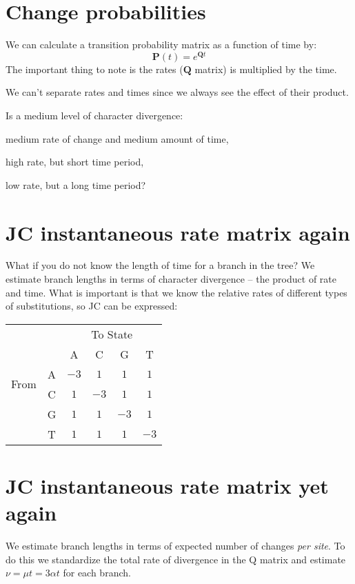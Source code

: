 \documentclass[landscape]{foils}
\begin{document}
\myNewSlide
\section*{Change probabilities}
We can calculate a transition probability matrix as a function of time by:
\[\mathbf{P}(t) = e^{\mathbf{Q}t}\]
The important thing to note is the rates ($\mathbf{Q}$ matrix) is multiplied by the time.

We can't separate rates and times since we always see the effect of their product.

Is a medium level of character divergence:
\begin{compactenum}
	\item medium rate of change and medium amount of time,
	\item high rate, but short time period,
	\item low rate, but a long time period?
\end{compactenum}
\myNewSlide
\section*{JC instantaneous rate matrix again}
What if you do not know the length of time for a branch in the tree?
We estimate branch lengths in terms of character divergence -- the product of rate and time.
What is important is that we know the relative rates of different types of substitutions, so JC can be expressed:
\begin{table}[htdp]
\begin{center}
\begin{tabular}{cc|cccc}
& & \multicolumn{4}{c}{To State} \\
& & A & C & G & T \\
\hline
\multirow{2}{*}{From } & A &  $-3$ & $1$ & $1$ & $1$    \\
\multirow{2}{*}{State } &C & $1$ & $-3$ & $1$ & $1$    \\
 &G & $1$ & $1$ & $-3$ & $1$ \\
 &T & $1$ & $1$ & $1$ & $-3$ \\
\end{tabular}
\end{center}
\end{table}

\myNewSlide
\section*{JC instantaneous rate matrix yet again}
We estimate branch lengths in terms of expected number of changes {\em per site}.
To do this we standardize the total rate of divergence in the Q matrix and estimate $\nu = \mu t = 3\alpha t$
for each branch.
\end{document}
